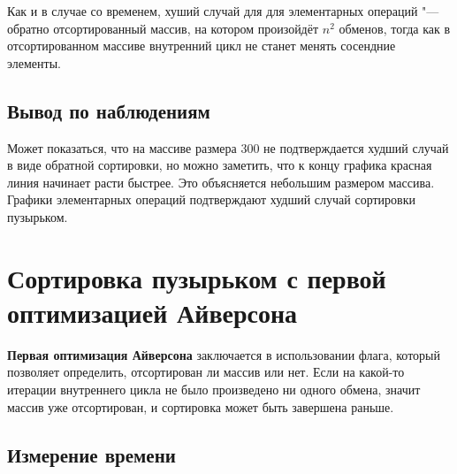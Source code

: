 \documentclass[11pt]{article}
\begin{document}
\begin{center}
\end{center}
{ \hspace*{\fill} }

\begin{center}
\end{center}
{ \hspace*{\fill} }

Как и в случае со временем, хуший случай для для элементарных операций "--- обратно отсортированный массив,
на котором произойдёт $n^2$ обменов, тогда как в отсортированном массиве внутренний цикл не станет менять
сосендние элементы.

\subsection{Вывод по наблюдениям}

Может показаться, что на массиве размера 300 не подтверждается худший случай в виде обратной сортировки,
но можно заметить, что к концу графика красная линия начинает расти быстрее. Это объясняется небольшим
размером массива. Графики элементарных операций подтверждают худший случай сортировки пузырьком.

\newpage

\setcounter{section}{3}
\section*{\centering Сортировка пузырьком с первой оптимизацией Айверсона}

\textbf{Первая оптимизация Айверсона} заключается в использовании флага, который позволяет определить, отсортирован ли массив
или нет. Если на какой-то итерации внутреннего цикла не было произведено ни одного обмена, значит массив
уже отсортирован, и сортировка может быть завершена раньше.

\setcounter{subsection}{0}
\subsection{Измерение времени}

\begin{center}
\end{center}
{ \hspace*{\fill} }
\end{document}

